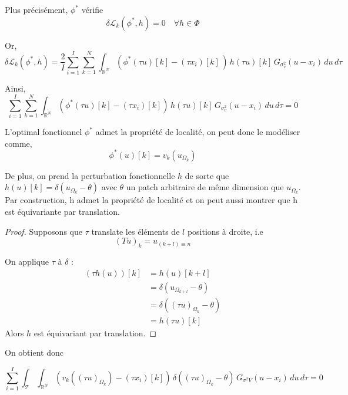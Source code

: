 \documentclass[a4paper,10pt]{article}
\theoremstyle{definition} %
\theoremstyle{definition} %
\theoremstyle{definition} %
\theoremstyle{definition} %
\newcommand{\R}{\mathbb{R}}
\begin{document}
Plus précisément, $\phi^*$ vérifie 
\begin{equation*}
    \delta\mathcal{L}_k(\phi^*,h) = 0 \quad\forall h \in \Phi 
\end{equation*}

Or, 
\begin{equation*}
    \delta\mathcal{L}_k(\phi^*,h) = \frac{2}{I} \sum_{i=1}^{I} \sum_{k=1}^{N} \int_{\R^N}  \left(\phi^*(\tau u)[k] - (\tau x_i)[k]\,\right)\, h(\tau u)[k] \,G_{\sigma_v^2} (u - x_i) \, du \, d\tau
\end{equation*}

Ainsi,
\begin{equation*}
    \sum_{i=1}^{I} \sum_{k=1}^{N} \int_{\R^N} (\phi^*(\tau u)[k] - (\tau x_i)[k]) \,h(\tau u)[k] \,G_{\sigma_v^2} (u - x_i) \, du \, d\tau =0
\end{equation*}

L'optimal fonctionnel $\phi^*$ admet la propriété de localité, on peut donc le modéliser comme,
\begin{equation*}
    \phi^*(u)[k] = v_k(u_{\Omega_k})
\end{equation*}

De plus, on prend la perturbation fonctionnelle $h$ de sorte que $h(u)[k] = \delta (u_{\Omega_k} - \theta)$ avec $\theta$ un patch arbitraire de même dimension que $u_{\Omega_k}$. Par construction, h admet la propriété de localité et on peut aussi montrer que h est équivariante par translation.
\begin{proof}
    Supposons que $\tau$ translate les éléments de $l$ positions à droite, i.e
\[
(Tu)_k = u_{(k+l)\equiv n}
\]

On applique $\tau$ à $\delta$ :
\begin{align*}
    (\tau h(u)) [k] &= h(u)[k+l] \\
    &= \delta (u_{\Omega_{k+l}} - \theta)\\
    &= \delta ((\tau u)_{\Omega_k} - \theta)\\
    &= h (\tau u) [k]
\end{align*}
Alors $h$ est équivariant par translation.
\end{proof}

On obtient donc

\begin{equation*}
    \sum_{i=1}^{I}\int_\mathcal{T} \int_{\R^N} (v_k((\tau u)_{\Omega_k}) - (\tau x_i)[k])\, \delta ((\tau u)_{\Omega_k} - \theta) \, G_{\sigma^2 V} (u - x_i) \, du \, d\tau =0
\end{equation*}
\end{document}

